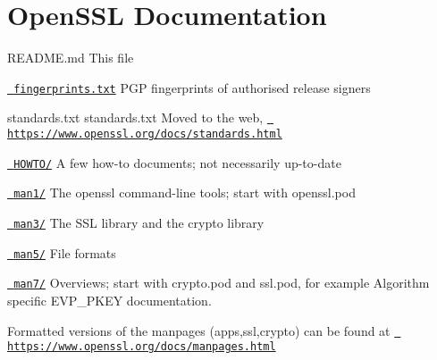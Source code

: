 \chapter{Open\+SSL Documentation}
\hypertarget{md__c_1_2_users_2namph_2_downloads_2openssl_2openssl-3_82_81_2doc_2_r_e_a_d_m_e}{}\label{md__c_1_2_users_2namph_2_downloads_2openssl_2openssl-3_82_81_2doc_2_r_e_a_d_m_e}
README.\+md This file

\href{fingerprints.txt}{\texttt{ fingerprints.\+txt}} PGP fingerprints of authorised release signers

standards.\+txt standards.\+txt Moved to the web, \href{https://www.openssl.org/docs/standards.html}{\texttt{ https\+://www.\+openssl.\+org/docs/standards.\+html}}

\href{HOWTO/}{\texttt{ HOWTO/}} A few how-\/to documents; not necessarily up-\/to-\/date

\href{man1/}{\texttt{ man1/}} The openssl command-\/line tools; start with openssl.\+pod

\href{man3/}{\texttt{ man3/}} The SSL library and the crypto library

\href{man5/}{\texttt{ man5/}} File formats

\href{man7/}{\texttt{ man7/}} Overviews; start with crypto.\+pod and ssl.\+pod, for example Algorithm specific EVP\+\_\+\+PKEY documentation.

Formatted versions of the manpages (apps,ssl,crypto) can be found at \href{https://www.openssl.org/docs/manpages.html}{\texttt{ https\+://www.\+openssl.\+org/docs/manpages.\+html}} 
